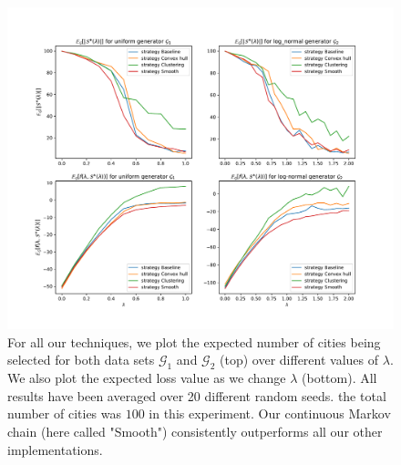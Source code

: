 \documentclass[conference,compsoc]{IEEEtran}
\begin{document}
\begin{figure}
    \centering
    \includegraphics[width=\linewidth, trim=55 55 55 55, clip]{images/Expectation_f_num_cities_100.pdf}
    \caption{For all our techniques, we plot the expected number of cities being
    selected for both data sets $\mathcal{G}_1$ and $\mathcal{G}_2$ (top) over
    different values of $\lambda$. We also plot the expected loss value as we
    change $\lambda$ (bottom). All results have been averaged over 20 different
    random seeds. the total number of cities was $100$ in this experiment. Our
    continuous Markov chain (here called "Smooth") consistently outperforms all our other
    implementations.}
    \label{fig:loss_plots100}
\end{figure}
\end{document}

